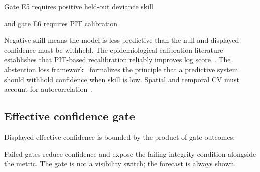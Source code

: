Gate E5 requires positive held-out deviance skill

\eqdevskill

and gate E6 requires PIT calibration

\eqpit Negative skill means the model is less predictive than the null and displayed confidence must be withheld. The epidemiological calibration literature establishes that PIT-based recalibration reliably improves log score~\cite{arxiv211206305}. The abstention loss framework~\cite{arxiv210408236} formalizes the principle that a predictive system should withhold confidence when skill is low. Spatial and temporal CV must account for autocorrelation~\cite{arxiv200514263,arxiv190511744}.

\subsection{Effective confidence gate}

Displayed effective confidence is bounded by the product of gate outcomes:

\eqeffconf Failed gates reduce confidence and expose the failing integrity condition alongside the metric. The gate is not a visibility switch; the forecast is always shown.
